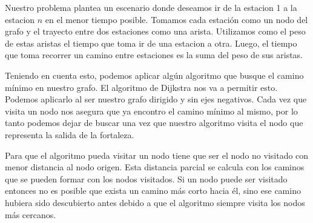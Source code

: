 

Nuestro problema plantea un escenario donde deseamos ir de la estacion 1 a la estacion $n$ en el menor tiempo posible. Tomamos cada estación como un nodo del grafo y el trayecto entre dos estaciones como una arista. Utilizamos como el peso de estas aristas el tiempo que toma ir de una estacion a otra. Luego, el tiempo que toma recorrer un camino entre estaciones es la suma del peso de sus aristas. 

Teniendo en cuenta esto, podemos aplicar algún algoritmo que busque el camino mínimo en nuestro grafo. El algoritmo de Dijkstra nos va a permitir esto. Podemos aplicarlo al ser nuestro grafo dirigido y sin ejes negativos. Cada vez que visita un nodo nos asegura que ya encontro el camino mínimo al mismo, por lo tanto podemos dejar de buscar una vez que nuestro algoritmo visita el nodo que representa la salida de la fortaleza.

Para que el algoritmo pueda visitar un nodo tiene que ser el nodo no visitado con menor distancia al nodo origen. Esta distancia parcial se calcula con los caminos que se pueden formar con los nodos visitados. Si un nodo puede ser visitado entonces no es posible que exista un camino más corto hacia él, sino ese camino hubiera sido descubierto antes debido a que el algoritmo siempre visita los nodos más cercanos.
